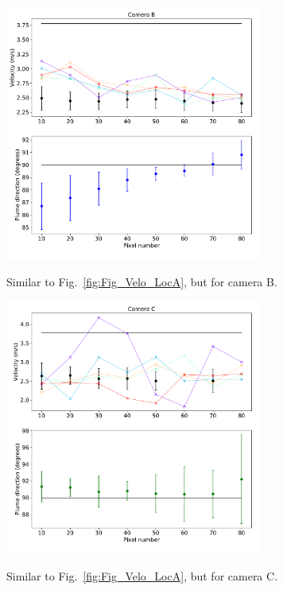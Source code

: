\documentclass[amtd, manuscript]{copernicus}
\begin{document}
\begin{figure}[!htb]
  \begin{center}
    \includegraphics[width=0.75\textwidth]{Fig_Velo_LocV01_istep_all.pdf}\\
    \caption{\label{fig:Fig_Velo_LocV01_istep_all}
      Similar to Fig.~\ref{fig:Fig_Velo_LocA}, but for camera B.
    }
  \end{center}
\end{figure}

\begin{figure}[!htb]
  \begin{center}
    \includegraphics[width=0.75\textwidth]{Fig_Velo_LocV02_istep_all.pdf}\\
    \caption{\label{fig:Fig_Velo_LocV02_istep_all}
      Similar to Fig.~\ref{fig:Fig_Velo_LocA}, but for camera C.
    }
  \end{center}
\end{figure}
\end{document}
